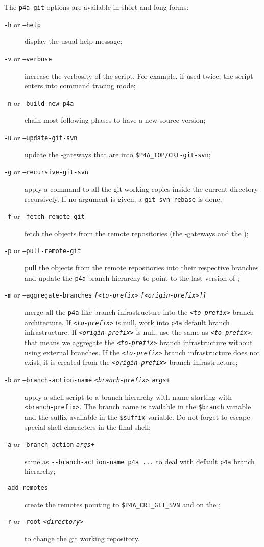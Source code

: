 \documentclass[a4paper]{article}
\begin{document}
The \verb|p4a_git| options are available in short and long forms:
\begin{description}
\item[\texttt{-h} or \texttt{--help}] display the usual help message;
\item[\texttt{-v} or \texttt{--verbose}] increase the verbosity of the
  script. For example, if used twice, the script enters into command
  tracing mode;
\item[\texttt{-n} or \texttt{--build-new-p4a}] chain most following phases
  to have a new \Apfa source version;
\item[\texttt{-u} or \texttt{--update-git-svn}] update the \Apips{}
  \Agit-\Asvn gateways that are into \verb|$P4A_TOP/CRI-git-svn|;%
\item[\texttt{-g} or \texttt{--recursive-git-svn}] apply a \Agit command
  to all the git working copies inside the current directory
  recursively. If no argument is given, a \texttt{git svn rebase} is done;
\item[\texttt{-f} or \texttt{--fetch-remote-git}] fetch the objects from
  the remote \Agit repositories (the \Apips{} \Agit-\Asvn gateways and the
  \Apolylib{} \Agit);
\item[\texttt{-p} or \texttt{--pull-remote-git}] pull the objects from the
  remote \Agit repositories into their respective branches and update the
  \texttt{p4a} branch hierarchy to point to the last version of \Apfa;
\item[\texttt{-m} or \texttt{--aggregate-branches}
  \texttt{\emph{[<to-prefix>}} \texttt{\emph{[<origin-prefix>]]}}] merge
  all the \texttt{p4a}-like branch infrastructure into the
  \texttt{\emph{<to-prefix>}} branch architecture. If
  \texttt{\emph{<to-prefix>}} is null, work into \texttt{p4a} default
  branch infrastructure. If \texttt{\emph{<origin-prefix>}} is null, use
  the same as \texttt{\emph{<to-prefix>}}, that means we aggregate the
  \texttt{\emph{<to-prefix>}} branch infrastructure without using external
  branches. If the \texttt{\emph{<to-prefix>}} branch infrastructure does
  not exist, it is created from the \texttt{\emph{<origin-prefix>}} branch
  infrastructure;
\item[\texttt{-b} or \texttt{--branch-action-name}
  \texttt{\emph{<branch-prefix>}} \texttt{\emph{args+}}] apply a
  shell-script to a branch hierarchy with name starting with
  \texttt{<branch-prefix>}. The branch name is available in the
  \texttt{\$branch} variable and the suffix available in the
  \texttt{\$suffix} variable. Do not forget to escape special shell
  characters in the final shell;
\item[\texttt{-a} or \texttt{--branch-action} \texttt{\emph{args+}}] same
  as \verb|--branch-action-name p4a ...| to deal with default \texttt{p4a}
  branch hierarchy;
\item[\texttt{--add-remotes}] create the remotes pointing
  to \verb|$P4A_CRI_GIT_SVN| and on the \Apolylib{} \Agit;
\item[\texttt{-r} or \texttt{--root} \texttt{<\emph{directory}>}] to
  change the git working repository.
\end{description}
\end{document}
